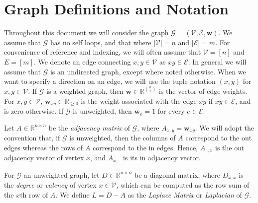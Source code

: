 \documentclass{report}
\begin{document}
\section{Graph Definitions and Notation} \label{background:sec:graphdef}

Throughout this document we will consider the graph $\mathcal{G} = (\mathcal{V}, \mathcal{E}, \mathbf{w})$.
We assume that $\mathcal{G}$ has no self loops, and that where $|\mathcal{V}| = n$ and $|\mathcal{E}| = m$.
For convenience of reference and indexing, we will often assume that $\mathcal{V} = [n]$ and $E = [m]$. 
We denote an edge connecting $x, y \in \mathcal{V}$ as $xy \in \mathcal{E}$. 
In general we will assume that $\mathcal{G}$ is an  undirected graph, except where noted otherwise. 
When we want to specify a direction on an edge, we will use the tuple notation $(x, y)$ for $x, y \in \mathcal{V}$.
If $\mathcal{G}$ is a weighted graph, then $\mathbf{w} \in \mathbb{R}^{{n \choose 2}}$ is the vector of edge weights. 
For $x, y \in \mathcal{V}$, $\mathbf{w}_{xy} \in \mathbb{R}_{\geq 0}$ is the weight associated with the edge $xy$ if $xy \in \mathcal{E}$, and is zero otherwise.
If $\mathcal{G}$ is unweighted, then $\mathbf{w}_e = 1$ for every $e \in \mathcal{E}$. 

Let $A \in \mathbb{R}^{n\times n}$ be the \emph{adjacency matrix} of $\mathcal{G}$, where $A_{x,y} = \mathbf{w}_{xy}$.
We will adopt the convention that, if $\mathcal{G}$ is unweighted, then the columns of $A$ correspond to the out edges whereas the rows of $A$ correspond to the in edges. 
Hence, $A_{:,x}$ is the out adjacency vector of vertex $x$, and $A_{x,:}$ is its in adjacency vector.

For $\mathcal{G}$ an unweighted graph, let $D \in \mathbb{R}^{n\times n}$ be a diagonal matrix, where $D_{x,x}$ is the \emph{degree} or \emph{valency} of vertex $x \in \mathcal{V}$, which can be computed as the row sum of the $x$th row of $A$. 
We define $L = D - A$ as the \emph{Laplace Matrix} or \emph{Laplacian} of $\mathcal{G}$.
\end{document}
